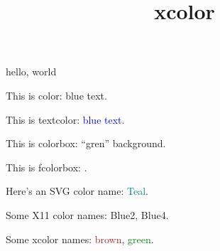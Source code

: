 \documentclass{amsart}
\title{xcolor}
\begin{document}
\maketitle

hello, world



This is color: {\color{blue} blue text}.

This is textcolor: \textcolor{blue}{blue text}.

This is colorbox: \colorbox{gren}{``gren'' background}.

This is fcolorbox: .

Here's an SVG color name: \textcolor{Teal}{Teal}.

Some X11 color names: \textcolor{Blue2}{Blue2}, \textcolor{Blue4}{Blue4}.

Some xcolor names: \textcolor{brown}{brown}, \textcolor{green}{green}.
\end{document}
